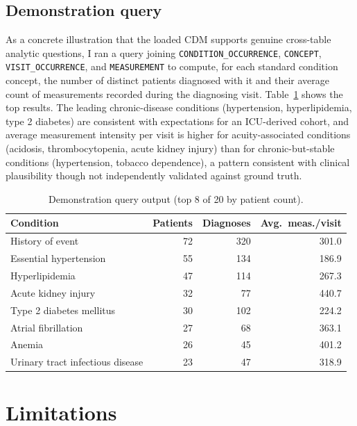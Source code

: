 \documentclass[11pt]{article}
\begin{document}
\subsection{Demonstration query}

As a concrete illustration that the loaded CDM supports genuine
cross-table analytic questions, I ran a query joining
\texttt{CONDITION\_OCCURRENCE}, \texttt{CONCEPT}, \texttt{VISIT\_OCCURRENCE},
and \texttt{MEASUREMENT} to compute, for each standard condition concept,
the number of distinct patients diagnosed with it and their average count
of measurements recorded during the diagnosing visit. Table~\ref{tab:demo}
shows the top results. The leading chronic-disease conditions (hypertension,
hyperlipidemia, type 2 diabetes) are consistent with expectations for an
ICU-derived cohort, and average measurement intensity per visit is higher
for acuity-associated conditions (acidosis, thrombocytopenia, acute kidney
injury) than for chronic-but-stable conditions (hypertension, tobacco
dependence), a pattern consistent with clinical plausibility though not
independently validated against ground truth.

\begin{table}[h]
\centering
\small
\caption{Demonstration query output (top 8 of 20 by patient count).}
\label{tab:demo}
\begin{tabular}{lrrr}
\toprule
Condition & Patients & Diagnoses & Avg.\ meas./visit \\
\midrule
History of event & 72 & 320 & 301.0 \\
Essential hypertension & 55 & 134 & 186.9 \\
Hyperlipidemia & 47 & 114 & 267.3 \\
Acute kidney injury & 32 & 77 & 440.7 \\
Type 2 diabetes mellitus & 30 & 102 & 224.2 \\
Atrial fibrillation & 27 & 68 & 363.1 \\
Anemia & 26 & 45 & 401.2 \\
Urinary tract infectious disease & 23 & 47 & 318.9 \\
\bottomrule
\end{tabular}
\end{table}

\section{Limitations}
\end{document}

